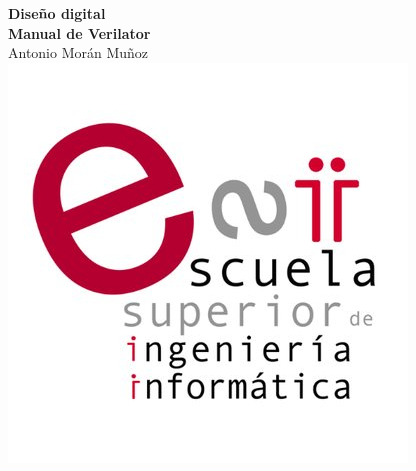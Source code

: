 \begin{titlepage}
\begin{flushright}
\LARGE{\textbf{Diseño digital}}\\
\vfill
\Huge{\textbf{Manual de Verilator}}\\
    \vfill
    \large Antonio Morán Muñoz\\
\vfill
\includegraphics[width=0.3\linewidth]{figs/esiiab-logo.jpg}\\ 
 
\end{flushright}
\end{titlepage}


